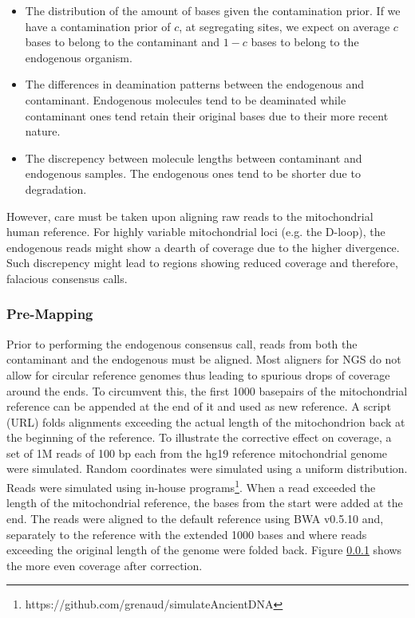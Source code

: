 \documentclass[a4paper,12pt]{article}
\begin{document}
\begin{itemize}
\item The distribution of the amount of bases given the contamination prior. If we have a contamination prior of $c$, at segregating sites, we expect on average $c$ bases to belong to the contaminant and $1-c$ bases to belong to the endogenous organism.
\item The differences in deamination patterns between the endogenous and contaminant. Endogenous molecules tend to be deaminated while contaminant ones tend retain their original bases due to their more recent nature. 
\item The discrepency between molecule lengths between contaminant and endogenous samples. The endogenous ones tend to be shorter due to degradation.
\end{itemize}

However, care must be taken upon aligning raw reads to the mitochondrial human reference. For highly variable mitochondrial loci (e.g. the D-loop), the endogenous reads might show a dearth of coverage due to the higher divergence. Such discrepency might lead to regions showing reduced coverage and therefore, falacious consensus calls.

\subsubsection{Pre-Mapping}


Prior to performing the endogenous consensus call, reads from both the contaminant and the endogenous must be aligned. Most aligners for NGS do not allow for circular reference genomes thus leading to spurious drops of coverage around the ends. To circumvent this, the first 1000 basepairs  of the mitochondrial reference can be appended at the end of it and used as new reference. A script (URL) folds alignments exceeding the actual length of the mitochondrion back at the beginning of the reference. To illustrate the corrective effect on coverage, a set of 1M reads of 100 bp each from the hg19 reference mitochondrial genome were simulated. Random coordinates were simulated using a uniform distribution. Reads were simulated using in-house programs\footnote{https://github.com/grenaud/simulateAncientDNA}. When a read exceeded the length of the mitochondrial reference, the bases from the start were added at the end. The reads were aligned to the default reference using BWA v0.5.10\cite{} and, separately to the reference with the extended 1000 bases and where reads exceeding the original length of the genome were folded back. Figure \ref{} shows the more even coverage after correction.
\end{document}
